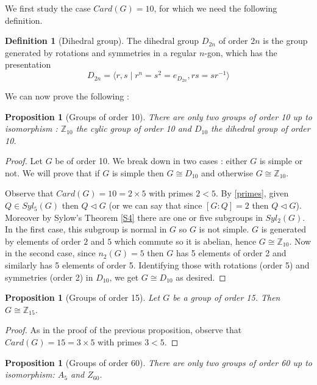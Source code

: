 \documentclass{article}
\theoremstyle{definition}
\theoremstyle{plain}
\theoremstyle{plain}
\theoremstyle{plain}
\theoremstyle{plain}
\theoremstyle{definition}
\newtheorem{defeng}[subsubsection]{Definition}
\theoremstyle{plain}
\theoremstyle{plain}
\newtheorem{propeng}[subsubsection]{Proposition}
\begin{document}
\par We first study the case \( Card(G) = 10 \), for which we need the following definition.
\begin{defeng}[Dihedral group]
	The dihedral group \( D_{2n} \) of order \( 2n \) is the group generated by rotations and symmetries in a regular \(n\)-gon, which has the presentation 
	\begin{equation*}
		D_{2n} = \langle r,s \mid r^{n} = s^{2} = e_{D_{2n}}, rs = sr^{-1} \rangle 
	\end{equation*}
\end{defeng}

We can now prove the following :

\begin{propeng}[Groups of order 10]
	There are only two groups of order 10 up to isomorphism : \( \mathbb{Z}_{10} \) the cylic group of order 10 and \( D_{10} \) the dihedral group of order 10.
\end{propeng}

\begin{proof}
	Let \( G \) be of order 10. We break down in two cases : either \( G \) is simple or not. We will prove that if \( G \) is simple then \( G \cong D_{10} \) and otherwise \( G \cong \mathbb{Z}_{10} \).

	Observe that \( Card(G) = 10 = 2 \times 5 \) with primes \( 2 < 5\). By \cref{primes}, given \( Q \in Syl_5(G) \) then \( Q \triangleleft G \) (or we can say that since \( [G:Q] = 2 \) then \( Q \triangleleft G \)).
	Moreover by Sylow's Theorem \ref{S4} there are one or five subgroups in \( Syl_2(G) \). In the first case, this subgroup is normal in \( G \) so \( G \) is not simple. \( G \) is generated by elements of order \( 2 \) and \( 5 \) which commute so it is abelian, hence \( G \cong \mathbb{Z}_{10} \). Now in the second case, since \( n_2(G) = 5 \) then \( G \) has 5 elements of order 2 and similarly has 5 elements of order 5. Identifying those with rotations (order 5) and symmetries (order 2) in \( D_{10} \), we get \( G \cong D_{10} \) as desired.
\end{proof} 

\begin{propeng}[Groups of order 15]
Let \( G \) be a group of order 15. Then \( G \cong \mathbb{Z}_{15} \).
\end{propeng}

\begin{proof}
	As in the proof of the previous proposition, observe that \( Card(G) = 15 = 3 \times 5 \) with primes \( 3 < 5 \).	
\end{proof}

\begin{propeng}[Groups of order 60]
	There are only two groups of order 60 up to isomorphism: \( A_5 \) and \( Z_{60} \).
\end{propeng}


\clearpage

\printbibliography
\end{document}
